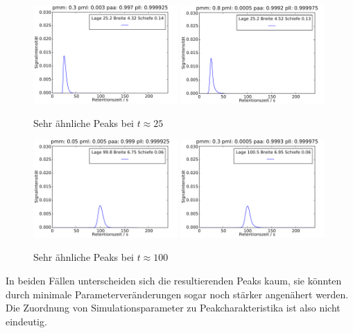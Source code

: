 \begin{figure}[h]
\includegraphics[width=0.49\textwidth]{bilder/kombis/1peak1_kombi1}
\includegraphics[width=0.49\textwidth]{bilder/kombis/1peak1_kombi2}
\caption{Sehr ähnliche Peaks bei $t \approx 25$}
\label{2kombis_1}
\end{figure}

\begin{figure}[h]
\includegraphics[width=0.49\textwidth]{bilder/kombis/1peak2_kombi1}
\includegraphics[width=0.49\textwidth]{bilder/kombis/1peak2_kombi2}
\caption{Sehr ähnliche Peaks bei $t \approx 100$}
\label{2kombis_2}
\end{figure}

In beiden Fällen unterscheiden sich die resultierenden Peaks kaum, sie könnten durch minimale Parameterveränderungen sogar noch stärker angenähert werden. Die Zuordnung von Simulationsparameter zu Peakcharakteristika ist also nicht eindeutig.

